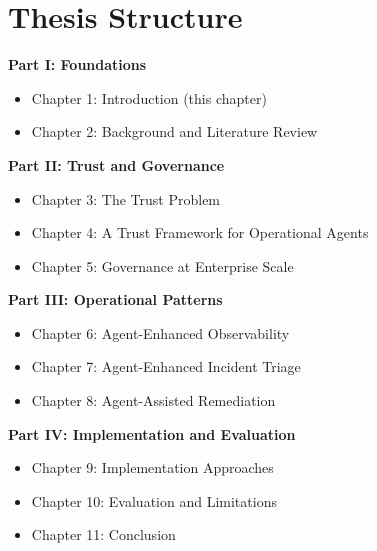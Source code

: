 \section{Thesis Structure}
\label{sec:structure}

\textbf{Part I: Foundations}
\begin{itemize}
    \item Chapter 1: Introduction (this chapter)
    \item Chapter 2: Background and Literature Review
\end{itemize}

\textbf{Part II: Trust and Governance}
\begin{itemize}
    \item Chapter 3: The Trust Problem
    \item Chapter 4: A Trust Framework for Operational Agents
    \item Chapter 5: Governance at Enterprise Scale
\end{itemize}

\textbf{Part III: Operational Patterns}
\begin{itemize}
    \item Chapter 6: Agent-Enhanced Observability
    \item Chapter 7: Agent-Enhanced Incident Triage
    \item Chapter 8: Agent-Assisted Remediation
\end{itemize}

\textbf{Part IV: Implementation and Evaluation}
\begin{itemize}
    \item Chapter 9: Implementation Approaches
    \item Chapter 10: Evaluation and Limitations
    \item Chapter 11: Conclusion
\end{itemize}
